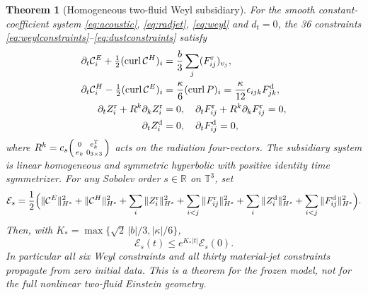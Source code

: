 \documentclass[10pt,a4paper]{article}
\newtheorem{theorem}{Theorem}[section]
\DeclareMathOperator{\curl}{curl}
\newcommand{\R}{\mathbb R}
\newcommand{\T}{\mathbb T}
\newcommand{\cE}{\mathcal C^{E}}
\newcommand{\cH}{\mathcal C^{H}}
\newcommand{\kgr}{\kappa}
\begin{document}
\begin{theorem}[Homogeneous two-fluid Weyl subsidiary]\label{thm:subsidiary}
For the smooth constant-coefficient system \eqref{eq:acoustic}, \eqref{eq:radjet}, \eqref{eq:weyl} and $d_t=0$, the 36 constraints \eqref{eq:weylconstraints}--\eqref{eq:dustconstraints} satisfy
\begin{align}\label{eq:36}
\partial_t\cE_i+\tfrac12(\curl\cH)_i
&=\frac b3\sum_j(F^{\rm r}_{ij})_{v_j},\\
\partial_t\cH_i-\tfrac12(\curl\cE)_i
&=\frac{\kgr}{6}(\curl P)_i
=\frac{\kgr}{12}\epsilon_{ijk}F^{\rm d}_{jk},\\
\partial_t Z^{\rm r}_i+R^k\partial_kZ^{\rm r}_i&=0,
\quad\partial_tF^{\rm r}_{ij}+R^k\partial_kF^{\rm r}_{ij}=0,\\
\partial_tZ^{\rm d}_i&=0,\quad\partial_tF^{\rm d}_{ij}=0,
\end{align}
where $R^k=c_s\begin{psmallmatrix}0&e_k^T\\e_k&0_{3\times3}\end{psmallmatrix}$ acts on the radiation four-vectors. The subsidiary system is linear homogeneous and symmetric hyperbolic with positive identity time symmetrizer. For any Sobolev order $s\in\R$ on $\T^3$, set
\begin{equation}\label{eq:energy}
\mathcal E_s=\frac12\Big(\|\cE\|_{H^s}^2+\|\cH\|_{H^s}^2
+\sum_i\|Z^{\rm r}_i\|_{H^s}^2
+\sum_{i<j}\|F^{\rm r}_{ij}\|_{H^s}^2
+\sum_i\|Z^{\rm d}_i\|_{H^s}^2
+\sum_{i<j}\|F^{\rm d}_{ij}\|_{H^s}^2\Big).
\end{equation}
Then, with $K_*=\max\{\sqrt2\,|b|/3,|\kgr|/6\}$,
\begin{equation}\label{eq:estimate}
\mathcal E_s(t)\le e^{K_*|t|}\mathcal E_s(0).
\end{equation}
In particular all six Weyl constraints and all thirty material-jet constraints propagate from zero initial data. This is a theorem for the \emph{frozen model}, not for the full nonlinear two-fluid Einstein geometry.
\end{theorem}
\end{document}
